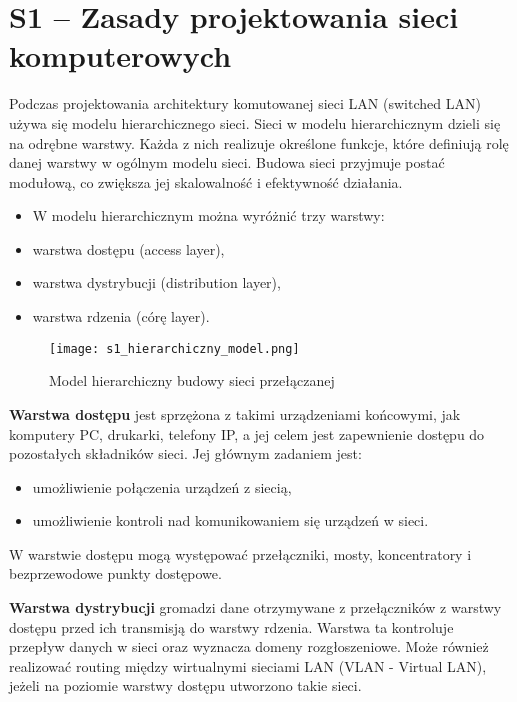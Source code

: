 \section{S1 -- Zasady projektowania sieci komputerowych}

Podczas projektowania architektury komutowanej sieci LAN (switched LAN) używa się modelu hierarchicznego sieci. Sieci w modelu hierarchicznym dzieli się na odrębne warstwy. Każda z nich realizuje określone funkcje, które definiują rolę danej warstwy w ogólnym modelu sieci. Budowa sieci przyjmuje postać modułową, co zwiększa jej skalowalność i efektywność działania.

\begin{itemize}
	\setlength\itemsep{1pt}
	\item[] {W modelu hierarchicznym można wyróżnić trzy warstwy:}
	\item warstwa dostępu (access layer),
	\item warstwa dystrybucji (distribution layer),
	\item warstwa rdzenia (córę layer).
\end{itemize}

\begin{figure}[H]
	\centering
	\texttt{[image: s1\_hierarchiczny\_model.png]}
	\caption{Model hierarchiczny budowy sieci przełączanej}
\end{figure}

\textbf{Warstwa dostępu} jest sprzężona z takimi urządzeniami końcowymi, jak komputery PC, drukarki, telefony IP, a jej celem jest zapewnienie dostępu do pozostałych składników sieci. Jej głównym zadaniem jest:

\begin{itemize}
	\setlength\itemsep{1pt}
	\item umożliwienie połączenia urządzeń z siecią,
	\item umożliwienie kontroli nad komunikowaniem się urządzeń w sieci.
\end{itemize}

W warstwie dostępu mogą występować przełączniki, mosty, koncentratory i bezprzewodowe punkty dostępowe.

\textbf{Warstwa dystrybucji} gromadzi dane otrzymywane z przełączników z warstwy dostępu przed ich transmisją do warstwy rdzenia. Warstwa ta kontroluje przepływ danych w sieci oraz wyznacza domeny rozgłoszeniowe. Może również realizować routing między wirtualnymi sieciami LAN (VLAN - Virtual LAN), jeżeli na poziomie warstwy dostępu utworzono takie sieci.

